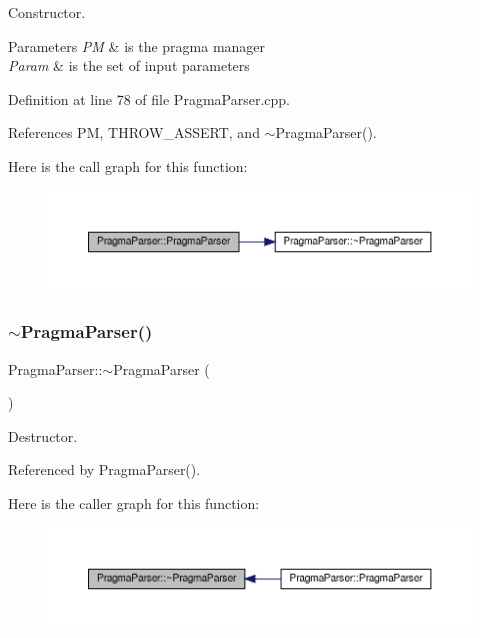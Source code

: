 Constructor. 


\begin{DoxyParams}{Parameters}
{\em PM} & is the pragma manager \\
\hline
{\em Param} & is the set of input parameters \\
\hline
\end{DoxyParams}


Definition at line 78 of file Pragma\+Parser.\+cpp.



References PM, T\+H\+R\+O\+W\+\_\+\+A\+S\+S\+E\+RT, and $\sim$\+Pragma\+Parser().

Here is the call graph for this function\+:
\nopagebreak
\begin{figure}[H]
\begin{center}
\leavevmode
\includegraphics[width=350pt]{d6/d6c/classPragmaParser_a34a232bfaef4e229d656ab163a9e4666_cgraph}
\end{center}
\end{figure}
\mbox{\label{classPragmaParser_ae039c214e80153245ca2a03f824f7abf}} 
\subsubsection{\texorpdfstring{$\sim$\+Pragma\+Parser()}{~PragmaParser()}}
{\footnotesize\ttfamily Pragma\+Parser\+::$\sim$\+Pragma\+Parser (\begin{DoxyParamCaption}{ }\end{DoxyParamCaption})\hspace{0.3cm}{\ttfamily [default]}}



Destructor. 



Referenced by Pragma\+Parser().

Here is the caller graph for this function\+:
\nopagebreak
\begin{figure}[H]
\begin{center}
\leavevmode
\includegraphics[width=350pt]{d6/d6c/classPragmaParser_ae039c214e80153245ca2a03f824f7abf_icgraph}
\end{center}
\end{figure}


